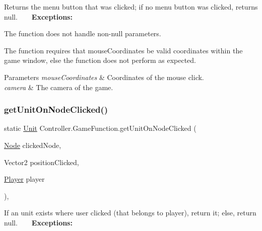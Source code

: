 Returns the menu button that was clicked; if no menu button was clicked, returns null. ~\newline
~\newline
 {\bfseries Exceptions\+:} ~\newline

\begin{DoxyItemize}
\item The function does not handle non-\/null parameters.
\item The function requires that mouse\+Coordinates be valid coordinates within the game window, else the function does not perform as expected. 
\begin{DoxyParams}{Parameters}
{\em mouse\+Coordinates} & Coordinates of the mouse click. \\
\hline
{\em camera} & The camera of the game. \\
\hline
\end{DoxyParams}

\end{DoxyItemize}\hypertarget{class_controller_1_1_game_function_a35acdb9a83b042e26aab920de8b6f25d}{}\label{class_controller_1_1_game_function_a35acdb9a83b042e26aab920de8b6f25d} 
\subsubsection{\texorpdfstring{get\+Unit\+On\+Node\+Clicked()}{getUnitOnNodeClicked()}}
{\footnotesize\ttfamily static \hyperlink{interface_model_1_1_unit_module_1_1_unit}{Unit} Controller.\+Game\+Function.\+get\+Unit\+On\+Node\+Clicked (\begin{DoxyParamCaption}\item[{\hyperlink{class_model_1_1_map_module_1_1_node}{Node}}]{clicked\+Node,  }\item[{Vector2}]{position\+Clicked,  }\item[{\hyperlink{class_model_1_1_player}{Player}}]{player }\end{DoxyParamCaption})\hspace{0.3cm}{\ttfamily [inline]}, {\ttfamily [static]}}

If an unit exists where user clicked (that belongs to player), return it; else, return null. ~\newline
~\newline
 {\bfseries Exceptions\+:} ~\newline

